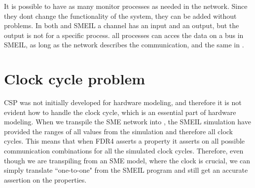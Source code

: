 
It is possible to have as many monitor processes as needed in the network. Since they dont change the functionality of the system, they can be added without problems. In both \cspm and SMEIL a channel has an input and an output, but the output is not for a specific process. all processes can acces the data on a bus in SMEIL, as long as the network describes the communication, and the same in \cspm.








\section{Clock cycle problem}


CSP was not initially developed for hardware modeling, and therefore it is not evident how to handle the clock cycle, which is an essential part of hardware modeling. When we transpile the SME network into \cspm{}, the SMEIL simulation have provided the ranges of all values from the simulation and therefore all clock cycles. This means that when FDR4 asserts a property it asserts on all possible communication combinations for all the simulated clock cycles. Therefore, even though we are transpiling from an SME model, where the clock is crucial, we can simply translate ``one-to-one" from the SMEIL program and still get an accurate assertion on the properties.




